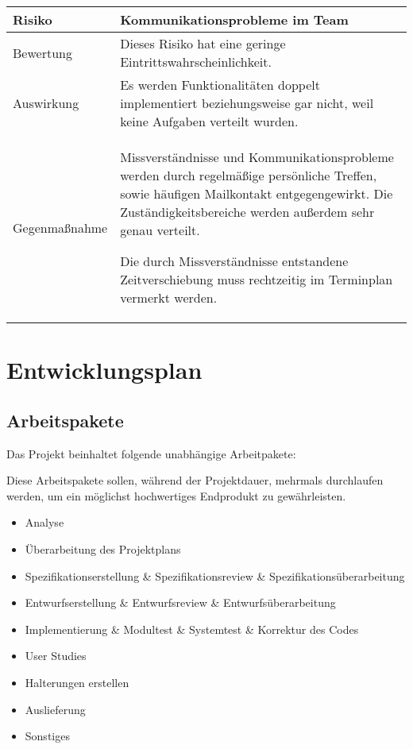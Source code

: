 \begin{center}
	\begin{tabular}{| p{3cm} | p{12cm} |}
		\hline
		Risiko & Kommunikationsprobleme im Team \\ \hline
		
		Bewertung & Dieses Risiko hat eine geringe Eintrittswahrscheinlichkeit. \\ \hline
		
		Auswirkung & Es werden Funktionalitäten doppelt implementiert beziehungsweise gar nicht, weil keine Aufgaben verteilt wurden. \\ \hline
		
		Gegenmaßnahme & Missverständnisse und Kommunikationsprobleme werden durch regelmäßige persönliche Treffen, sowie häufigen Mailkontakt entgegengewirkt.
		Die Zuständigkeitsbereiche werden außerdem sehr genau verteilt.
		
		Die durch Missverständnisse entstandene Zeitverschiebung muss rechtzeitig im Terminplan vermerkt werden. \\
		\hline
	\end{tabular}
\end{center}

\section{Entwicklungsplan}

\subsection{Arbeitspakete}
Das Projekt beinhaltet folgende unabhängige Arbeitpakete:

Diese Arbeitspakete sollen, während der Projektdauer, mehrmals durchlaufen werden, um ein möglichst hochwertiges Endprodukt zu gewährleisten.
\begin{itemize}
	\item Analyse
	\item Überarbeitung des Projektplans
	\item Spezifikationserstellung \& Spezifikationsreview \& Spezifikationsüberarbeitung
	\item Entwurfserstellung \& Entwurfsreview \& Entwurfsüberarbeitung
	\item Implementierung \& Modultest \& Systemtest \& \ggf Korrektur des Codes
	\item User Studies
	\item Halterungen erstellen
	\item Auslieferung
	\item Sonstiges
\end{itemize}

